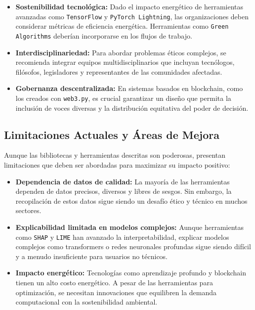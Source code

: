 \begin{refsection}
\begin{itemize}
    \item \textbf{Sostenibilidad tecnológica:}  
    Dado el impacto energético de herramientas avanzadas como \texttt{TensorFlow} y \texttt{PyTorch Lightning}, las organizaciones deben considerar métricas de eficiencia energética. Herramientas como \texttt{Green Algorithms} deberían incorporarse en los flujos de trabajo.

    \item \textbf{Interdisciplinariedad:}  
    Para abordar problemas éticos complejos, se recomienda integrar equipos multidisciplinarios que incluyan tecnólogos, filósofos, legisladores y representantes de las comunidades afectadas.

    \item \textbf{Gobernanza descentralizada:}  
    En sistemas basados en blockchain, como los creados con \texttt{web3.py}, es crucial garantizar un diseño que permita la inclusión de voces diversas y la distribución equitativa del poder de decisión.
\end{itemize}


\subsection{Limitaciones Actuales y Áreas de Mejora}

Aunque las bibliotecas y herramientas descritas son poderosas, presentan limitaciones que deben ser abordadas para maximizar su impacto positivo:

\begin{itemize}
    \item \textbf{Dependencia de datos de calidad:}  
    La mayoría de las herramientas dependen de datos precisos, diversos y libres de sesgos. Sin embargo, la recopilación de estos datos sigue siendo un desafío ético y técnico en muchos sectores.

    \item \textbf{Explicabilidad limitada en modelos complejos:}  
    Aunque herramientas como \texttt{SHAP} y \texttt{LIME} han avanzado la interpretabilidad, explicar modelos complejos como transformers o redes neuronales profundas sigue siendo difícil y a menudo insuficiente para usuarios no técnicos.

    \item \textbf{Impacto energético:}  
    Tecnologías como aprendizaje profundo y blockchain tienen un alto costo energético. A pesar de las herramientas para optimización, se necesitan innovaciones que equilibren la demanda computacional con la sostenibilidad ambiental.


\end{itemize}
\end{refsection}
